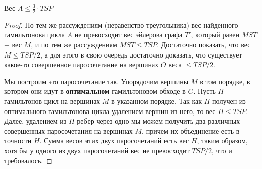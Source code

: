 \begin{theorem*} Вес $A \leq \frac{3}{2}\cdot TSP$\end{theorem*}
\begin{proof}
По тем же рассуждениям (неравенство треугольника) вес найденного гамильтонова цикла $A$ не превосходит вес эйлерова графа $T'$, который равен $MST$ $+$ вес $M$, и по тем же рассуждениям $MST \leq TSP$. Достаточно показать, что вес $M \leq TSP/2$, а для этого в свою очередь достаточно доказать, что существует какое-то совершенное паросочетание на вершинах $O$ веса $\leq TSP/2$.

Мы построим это паросочетание так. Упорядочим вершины $M$ в том порядке, в котором они идут в \textbf{оптимальном} гамильтоновом обходе в $G$. Пусть $H$~-- гамильтонов цикл на вершинах $M$ в указанном порядке. Так как $H$ получен из оптимального гамильтонова цикла удалением вершин из него, то вес $H \leq TSP$. Далее, удалением из $H$ ребер через одно мы можем получить два различных совершенных паросочетания на вершинах $M$, причем их объединение есть в точности $H$. Сумма весов этих двух паросочетаний есть вес $H$, таким образом, хотя бы у одного из двух паросочетаний вес не превосходит $TSP/2$, что и требовалось.
\end{proof}
